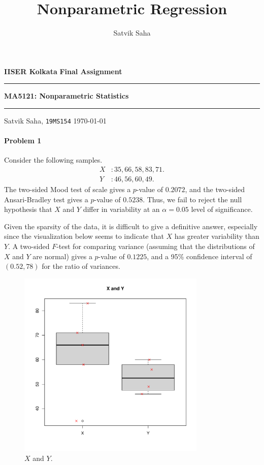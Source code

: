 \documentclass[10pt]{article}
\title{Nonparametric Regression}
\author{Satvik Saha}
\date{}
\begin{document}
    \noindent\textbf{IISER Kolkata} \hfill \textbf{Final Assignment}
    \vspace{3pt}
    \hrule
    \vspace{3pt}
    \begin{center}
    \LARGE{\textbf{MA5121: Nonparametric Statistics}}
    \end{center}
    \vspace{3pt}
    \hrule
    \vspace{3pt}
    Satvik Saha, \texttt{19MS154} \hfill \today
    \vspace{20pt}

    \setlength{\parskip}{1em}


    \paragraph{Problem 1} Consider the following samples. \begin{align*}
        X &: 35, 66, 58, 83, 71. \\
        Y &: 46, 56, 60, 49.
    \end{align*} The two-sided Mood test of scale gives a $p$-value of
    $0.2072$, and the two-sided Ansari-Bradley test gives a $p$-value of
    $0.5238$. Thus, we fail to reject the null hypothesis that $X$ and $Y$
    differ in variability at an $\alpha = 0.05$ level of significance.

    Given the sparsity of the data, it is difficult to give a definitive
    answer, especially since the visualization below seems to indicate that
    $X$ has greater variability than $Y$. A two-sided $F$-test for comparing
    variance (assuming that the distributions of $X$ and $Y$ are normal) gives
    a $p$-value of $0.1225$, and a 95\% confidence interval of $(0.52, 78)$
    for the ratio of variances.


    \begin{figure}[H]
        \centering
        \includegraphics[width=0.8\textwidth, page = 1]{final_plots.pdf}
        \vspace{-2em}
        \caption{$X$ and $Y$.}
        \label{fig:scale_test}
    \end{figure}
\end{document}
